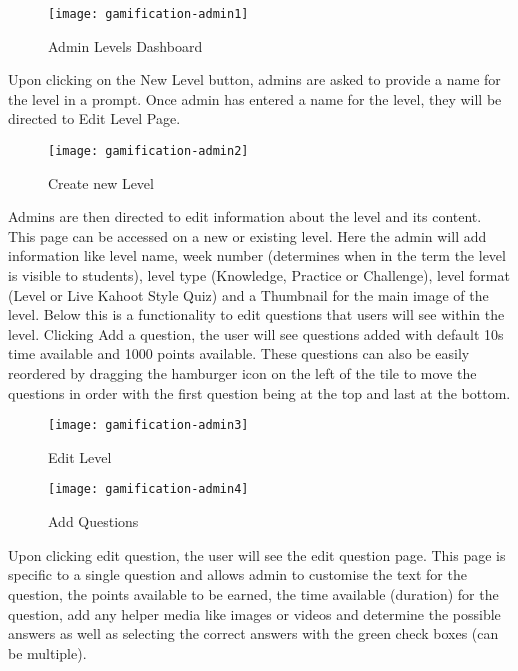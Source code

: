 \begin{figure}[h!]
    \texttt{[image: gamification-admin1]}
    \centering
    \caption{Admin Levels Dashboard}
\end{figure}

\newpage

Upon clicking on the New Level button, admins are asked to provide a name for the level in a prompt. Once admin has entered a name for the level, they will be directed to Edit Level Page.

\begin{figure}[h!]
    \texttt{[image: gamification-admin2]}
    \centering
    \caption{Create new Level}
\end{figure}

\newpage

Admins are then directed to edit information about the level and its content. This page can be accessed on a new or existing level. Here the admin will add information like level name, week number (determines when in the term the level is visible to students), level type (Knowledge, Practice or Challenge), level format (Level or Live Kahoot Style Quiz) and a Thumbnail for the main image of the level. Below this is a functionality to edit questions that users will see within the level. Clicking Add a question, the user will see questions added with default 10s time available and 1000 points available. These questions can also be easily reordered by dragging the hamburger icon on the left of the tile to move the questions in order with the first question being at the top and last at the bottom.

\begin{figure}[h!]
    \texttt{[image: gamification-admin3]}
    \centering
    \caption{Edit Level}
\end{figure}

\begin{figure}[h!]
    \texttt{[image: gamification-admin4]}
    \centering
    \caption{Add Questions}
\end{figure}

\newpage

Upon clicking edit question, the user will see the edit question page. This page is specific to a single question and allows admin to customise the text for the question, the points available to be earned, the time available (duration) for the question, add any helper media like images or videos and determine the possible answers as well as selecting the correct answers with the green check boxes (can be multiple).

